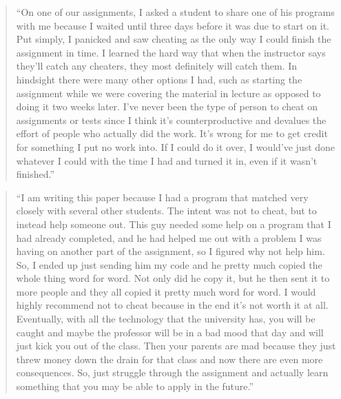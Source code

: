 \documentclass[12pt]{scrartcl}
\begin{document}
\begin{quote}
``On one of our assignments, I asked a student to share one of his programs with me
because I waited until three days before it was due to start on it. Put simply, I panicked and saw cheating as the only way I could finish the assignment in time. I learned the hard way that when the instructor says they'll catch any cheaters, they most definitely will catch them. In hindsight there were many other options I had, such as starting the assignment while we were covering the material in lecture as opposed to doing it two weeks later. I've never been the type of person to cheat on assignments or tests since I think it's counterproductive and devalues the effort of people who actually did the work. It's wrong for me to get credit for something I put no work into. If I could do it over, I would've just done whatever I could with the time I had and turned it in, even if it wasn't finished.''
\end{quote}

\begin{quote}
``I am writing this paper because I had a program that matched very closely with several other students. The intent was not to cheat, but to instead help someone out. This guy needed some help on a program that I had already completed, and he had helped me out with a problem I was having on another part of the assignment, so I figured why not help him. So, I ended up just sending him my code and he pretty much copied the whole thing word for word.  Not only did he copy it, but he then sent it to more people and they all copied it pretty much word for word. 
	I would highly recommend not to cheat because in the end it's not worth it at all. Eventually, with all the technology that the university has, you will be caught and maybe the professor will be in a bad mood that day and will just kick you out of the class. Then your parents are mad because they just threw money down the drain for that class and now there are even more consequences. So, just struggle through the assignment and actually learn something that you may be able to apply in the future.''
\end{quote}
\end{document}
